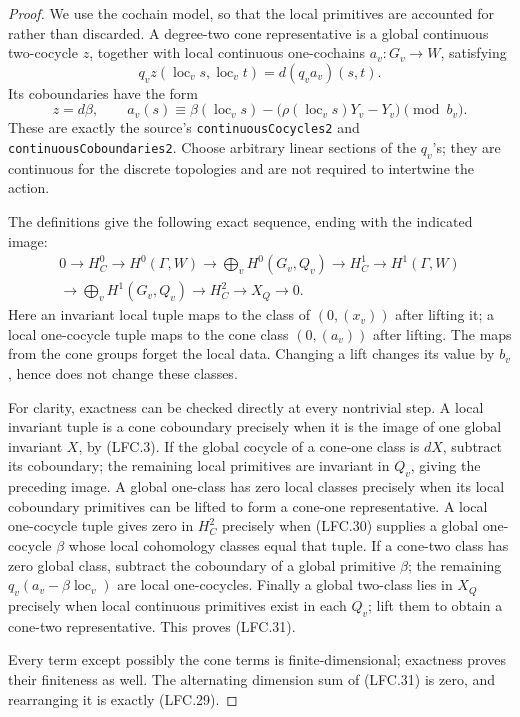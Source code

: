 \documentclass[11pt,a4paper]{article}
\numberwithin{equation}{section}
\theoremstyle{remark}\newtheorem{remark}[theorem]{Remark}
\begin{document}
\begin{proof}
We use the cochain model, so that the local primitives
are accounted for rather than discarded.
A degree-two cone representative is a global continuous
two-cocycle \(z\), together with local continuous
one-cochains \(a_v:G_v\to W\), satisfying
\[
 q_v z(\operatorname{loc}_v s,\operatorname{loc}_v t)
                         =d(q_v a_v)(s,t).
 \]
Its coboundaries have the form
\[
 z=d\beta,\qquad
 a_v(s)\equiv
   \beta(\operatorname{loc}_v s)
        -\bigl(\rho(\operatorname{loc}_v s)Y_v-Y_v\bigr)
                                    \pmod {b_v}.        \tag{LFC.30}
\]
These are exactly the source's
\texttt{continuous\allowbreak Cocycles2} and
\texttt{continuous\allowbreak Coboundaries2}.
Choose arbitrary linear sections of the \(q_v\)'s;
they are continuous for the discrete topologies and
are not required to intertwine the action.

The definitions give the following exact sequence, ending
with the indicated image:
\[
 \begin{gathered}
 0\longrightarrow H^0_C\longrightarrow H^0(\Gamma,W)
 \longrightarrow \bigoplus_v H^0(G_v,Q_v)
 \longrightarrow H^1_C\longrightarrow H^1(\Gamma,W)\\
 \longrightarrow\bigoplus_v H^1(G_v,Q_v)
 \longrightarrow H^2_C\longrightarrow X_Q
 \longrightarrow0.                                    \tag{LFC.31}
 \end{gathered}
\]
Here an invariant local tuple maps to the class of
\((0,(x_v))\) after lifting it; a local one-cocycle
tuple maps to the cone class \((0,(a_v))\) after lifting.
The maps from the cone groups forget the local data.
Changing a lift changes its value by \(b_v\), hence
does not change these classes.

For clarity, exactness can be checked directly at every
nontrivial step.  A local invariant tuple is a cone
coboundary precisely when it is the image of one global
invariant \(X\), by (LFC.3).
If the global cocycle of a cone-one class is \(dX\),
subtract its coboundary; the remaining local primitives
are invariant in \(Q_v\), giving the preceding image.
A global one-class has zero local classes precisely
when its local coboundary primitives can be lifted to
form a cone-one representative.
A local one-cocycle tuple gives zero in \(H^2_C\)
precisely when (LFC.30) supplies a global one-cocycle
\(\beta\) whose local cohomology classes equal that tuple.
If a cone-two class has zero global class, subtract
the coboundary of a global primitive \(\beta\);
the remaining \(q_v(a_v-\beta\operatorname{loc}_v)\)
are local one-cocycles.
Finally a global two-class lies in \(X_Q\) precisely
when local continuous primitives exist in each \(Q_v\);
lift them to obtain a cone-two representative.
This proves (LFC.31).

Every term except possibly the cone terms is
finite-dimensional; exactness proves their finiteness
as well.  The alternating dimension sum of (LFC.31)
is zero, and rearranging it is exactly (LFC.29).
\end{proof}
\end{document}
